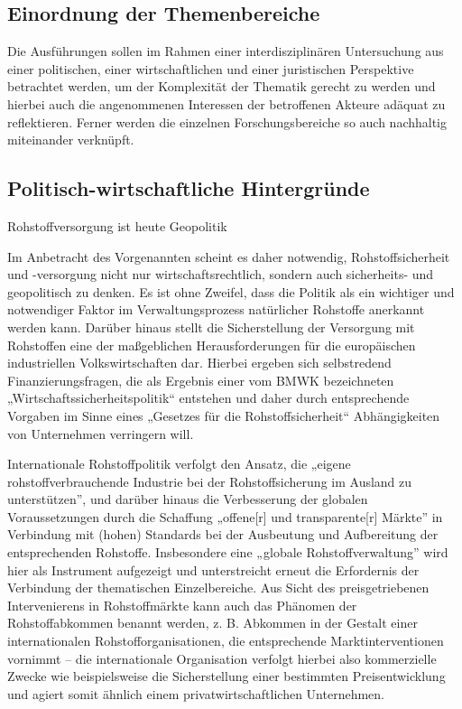 \documentclass[12pt,a4paper,oneside]{book} %
\begin{document}
	
	
	\subsection{Einordnung der Themenbereiche}
	Die Ausführungen sollen im Rahmen einer interdisziplinären Untersuchung aus einer politischen, einer wirtschaftlichen und einer juristischen Perspektive betrachtet werden, um der Komplexität der Thematik gerecht zu werden und hierbei auch die angenommenen Interessen der betroffenen Akteure adäquat zu reflektieren. Ferner werden die einzelnen Forschungsbereiche so auch nachhaltig miteinander verknüpft.
	
	\subsection{Politisch-wirtschaftliche Hintergründe}
	
	\glqq Rohstoffversorgung ist heute Geopolitik\grqq \autocite{https://www.nzz.ch/pro/europas-angst-vor-rohstoffmangel-wie-der-kontinent-versucht-sich-von-china-zu-emanzipieren-ld.1822991}
	
	Im Anbetracht des Vorgenannten scheint es daher notwendig, Rohstoffsicherheit und -versorgung nicht nur wirtschaftsrechtlich, sondern auch sicherheits- und geopolitisch zu denken. Es ist ohne Zweifel, dass die Politik als ein wichtiger und notwendiger Faktor im Verwaltungsprozess natürlicher Rohstoffe anerkannt werden kann.\autocite[hierzu ausführlich][239-248]{henning_politics_1968} Darüber hinaus stellt die Sicherstellung der Versorgung mit Rohstoffen eine der maßgeblichen Herausforderungen für die europäischen industriellen Volkswirtschaften dar.\autocite{europaische_kommission_study_2023} Hierbei ergeben sich selbstredend Finanzierungsfragen, die als Ergebnis einer vom BMWK bezeichneten „Wirtschaftssicherheitspolitik“ entstehen und daher durch entsprechende Vorgaben im Sinne eines „Gesetzes für die Rohstoffsicherheit“ Abhängigkeiten von Unternehmen verringern will.\autocite{lohr_gesetz_2022}
	
	Internationale Rohstoffpolitik verfolgt den Ansatz, die „eigene rohstoffverbrauchende Industrie bei der Rohstoffsicherung im Ausland zu unterstützen”, und darüber hinaus die Verbesserung der globalen Voraussetzungen durch die Schaffung „offene[r] und transparente[r] Märkte” in Verbindung mit (hohen) Standards bei der Ausbeutung und Aufbereitung der entsprechenden Rohstoffe.\autocite{acatech__deutsche_akademie_der_technikwissenschaften_rohstoffe_2017} Insbesondere eine „globale Rohstoffverwaltung” wird hier als Instrument aufgezeigt und unterstreicht erneut die Erfordernis der Verbindung der thematischen Einzelbereiche. Aus Sicht des preisgetriebenen Intervenierens in Rohstoffmärkte kann auch das Phänomen der Rohstoffabkommen benannt werden, z. B. Abkommen in der Gestalt einer internationalen Rohstofforganisationen, die entsprechende Marktinterventionen vornimmt – die internationale Organisation verfolgt hierbei also kommerzielle Zwecke wie beispielsweise die Sicherstellung einer bestimmten Preisentwicklung und agiert somit ähnlich einem privatwirtschaftlichen Unternehmen.\autocite[Paragraph 11, Rn. 4]{herdegen_internationales_2020}
	
\end{document}
